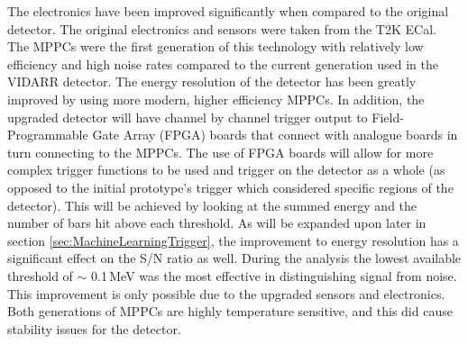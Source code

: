 The electronics have been improved significantly when compared to the original detector. The original electronics and sensors were taken from the T2K ECal. The MPPCs were the first generation of this technology with relatively low efficiency and high noise rates compared to the current generation used in the VIDARR detector. The energy resolution of the detector has been greatly improved by using more modern, higher efficiency MPPCs. In addition, the upgraded detector will have channel by channel trigger output to Field-Programmable Gate Array (FPGA) boards that connect with analogue boards in turn connecting to the MPPCs. The use of FPGA boards will allow for more complex trigger functions to be used and trigger on the detector as a whole (as opposed to the initial prototype's trigger which considered specific regions of the detector). This will be achieved by looking at the summed energy and the number of bars hit above each threshold. As will be expanded upon later in section \ref{sec:MachineLearningTrigger}, the improvement to energy resolution has a significant effect on the S/N ratio as well. During the analysis the lowest available threshold of $\sim$ 0.1\,MeV was the most effective in distinguishing signal from noise. This improvement is only possible due to the upgraded sensors and electronics. Both generations of MPPCs are highly temperature sensitive, and this did cause stability issues for the detector. %
